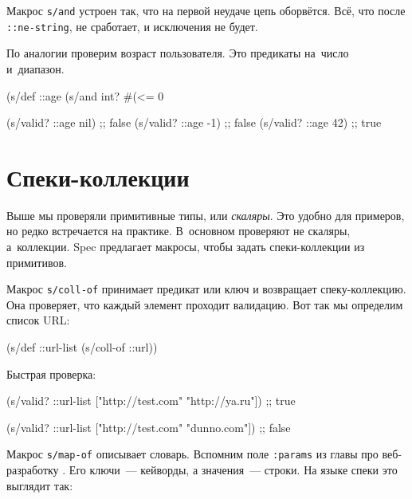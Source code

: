 Макрос \verb|s/and| устроен так, что на первой неудаче цепь
оборвётся. Всё, что после \verb|::ne-string|, не сработает, и
исключения не будет.

По аналогии проверим возраст пользователя. Это предикаты на~число и~диапазон.

\begin{english}
  \begin{clojure}
(s/def ::age
  (s/and int? #(<= 0 %

(s/valid? ::age nil) ;; false
(s/valid? ::age -1)  ;; false
(s/valid? ::age 42)  ;; true
  \end{clojure}
\end{english}

\section{Спеки-коллекции}


Выше мы проверяли примитивные типы, или \emph{скаляры}. Это удобно для примеров,
но редко встречается на практике. В~основном проверяют не скаляры,
а~коллекции. Spec предлагает макросы, чтобы задать спеки-коллекции из
примитивов.


Макрос \verb|s/coll-of| принимает предикат или ключ и возвращает
спеку-коллекцию. Она проверяет, что каждый элемент проходит валидацию. Вот так
мы определим список URL:

\begin{english}
  \begin{clojure}
(s/def ::url-list (s/coll-of ::url))
  \end{clojure}
\end{english}

\noindent
Быстрая проверка:

\begin{english}
  \begin{clojure}
(s/valid? ::url-list ["http://test.com" "http://ya.ru"])
;; true

(s/valid? ::url-list ["http://test.com" "dunno.com"])
;; false
  \end{clojure}
\end{english}


Макрос \verb|s/map-of| описывает словарь. Вспомним поле \verb|:params| из
главы про веб-разработку . Его ключи~--- кейворды, а значения~---
строки. На языке спеки это выглядит так:

